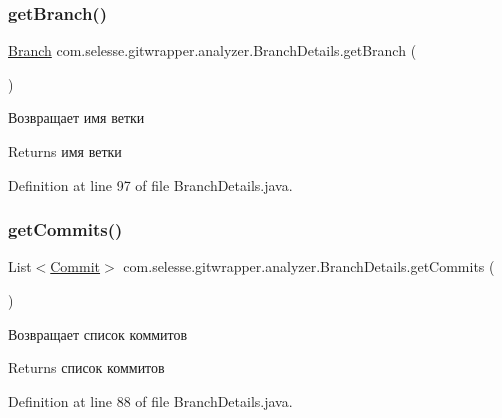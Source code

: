 \subsubsection{\texorpdfstring{get\+Branch()}{getBranch()}}
{\footnotesize\ttfamily \hyperlink{classcom_1_1selesse_1_1gitwrapper_1_1myobjects_1_1_branch}{Branch} com.\+selesse.\+gitwrapper.\+analyzer.\+Branch\+Details.\+get\+Branch (\begin{DoxyParamCaption}{ }\end{DoxyParamCaption})}

Возвращает имя ветки

\begin{DoxyReturn}{Returns}
имя ветки 
\end{DoxyReturn}


Definition at line 97 of file Branch\+Details.\+java.

\mbox{\label{classcom_1_1selesse_1_1gitwrapper_1_1analyzer_1_1_branch_details_a9c9212dc4f22e882d4f14f73eece3418}} 
\subsubsection{\texorpdfstring{get\+Commits()}{getCommits()}}
{\footnotesize\ttfamily List$<$\hyperlink{classcom_1_1selesse_1_1gitwrapper_1_1myobjects_1_1_commit}{Commit}$>$ com.\+selesse.\+gitwrapper.\+analyzer.\+Branch\+Details.\+get\+Commits (\begin{DoxyParamCaption}{ }\end{DoxyParamCaption})}

Возвращает список коммитов

\begin{DoxyReturn}{Returns}
список коммитов 
\end{DoxyReturn}


Definition at line 88 of file Branch\+Details.\+java.

\mbox{\label{classcom_1_1selesse_1_1gitwrapper_1_1analyzer_1_1_branch_details_a27797089119133ac5c5bfd50306b9fd6}} 
